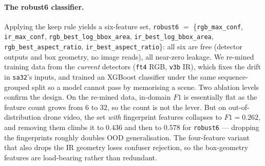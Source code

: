 \documentclass[12pt,a4paper,oneside,openright]{book}
\begin{document}
\paragraph{The robust6 classifier.}
Applying the keep rule yields a six-feature set, \texttt{robust6} $=$ \{\texttt{rgb\_max\_conf}, \texttt{ir\_max\_conf}, \texttt{rgb\_best\_log\_bbox\_area}, \texttt{ir\_best\_log\_bbox\_area}, \texttt{rgb\_best\_aspect\_ratio}, \texttt{ir\_best\_aspect\_ratio}\}: all six are free (detector outputs and box geometry, no image reads), all near-zero leakage. We re-mined training data from the \emph{current} detectors (\texttt{ft4} RGB, \texttt{v3b} IR), which fixes the drift in \texttt{sa32}'s inputs, and trained an XGBoost classifier under the same sequence-grouped split so a model cannot pass by memorising a scene. Two ablation levels confirm the design. On the re-mined data, in-domain $F1$ is essentially flat as the feature count grows from $6$ to $32$, so the count is not the lever. But on out-of-distribution drone video, the set \emph{with} fingerprint features collapses to $F1=0.262$, and removing them climbs it to $0.436$ and then to $0.578$ for \texttt{robust6} --- dropping the fingerprints roughly doubles OOD generalisation. The four-feature variant that also drops the IR geometry loses confuser rejection, so the box-geometry features are load-bearing rather than redundant.
\end{document}

